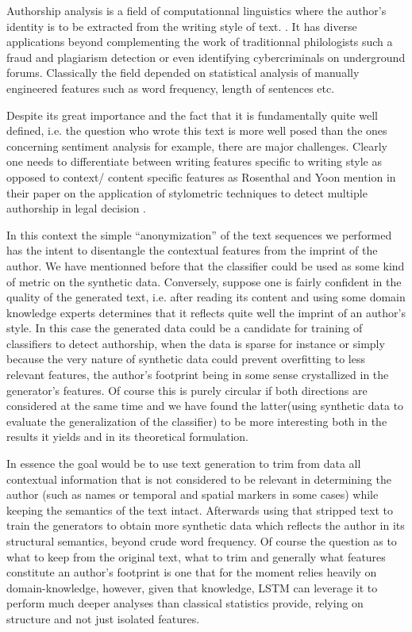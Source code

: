 Authorship analysis is a field of computationnal linguistics where
the author's identity is to be extracted from the writing style of text.
\cite{stylo}. It has diverse applications beyond complementing the
work of traditionnal philologists such a fraud and plagiarism detection
or even identifying cybercriminals on underground forums\cite{doppel}.
Classically the field depended on statistical analysis 
of manually engineered features such as word frequency, length of 
sentences etc. 

Despite its great importance and the fact that it is fundamentally
quite well defined, i.e. the question who wrote this text
is more well posed than the ones concerning sentiment analysis for
example, there are major challenges. Clearly one needs to differentiate
between writing features specific to writing style as opposed to
context/ content specific features as Rosenthal and Yoon mention in 
their paper on the application of stylometric techniques to detect
multiple authorship in legal decision .

In this context the simple ``anonymization'' of the text sequences we performed
has the intent to disentangle the contextual features from the imprint of the
author. We have mentionned before that the classifier could be used as some
kind of metric on the synthetic data. Conversely, suppose one is fairly
confident in the quality of the generated text, i.e. after reading its content
and using some domain knowledge experts determines that it reflects quite well
the imprint of an author's style. In this case the generated data could be a
candidate for training of classifiers to detect authorship, when the data is
sparse for instance or simply because the very nature of synthetic data could
prevent overfitting to less relevant features, the author's footprint being in
some sense crystallized in the generator's features. Of course this is purely
circular if both directions are considered at the same time and we have found
the latter(using synthetic data to evaluate the generalization of the
classifier) to be more interesting both in the results it yields and in its
theoretical formulation.

In essence the goal would be to use text generation to trim from data all
contextual information that is not considered to be relevant in determining the
author (such as names or temporal and spatial markers in some cases) while
keeping the semantics of the text intact. Afterwards using that stripped text
to train the generators to obtain more synthetic data which reflects the author
in its structural semantics, beyond crude word frequency.  Of course the
question as to what to keep from the original text, what to trim and generally
what features constitute an author's footprint is one that for the moment
relies heavily on domain-knowledge, however, given that knowledge, LSTM can
leverage it to perform much deeper analyses than classical statistics provide,
relying on structure and not just isolated features.



